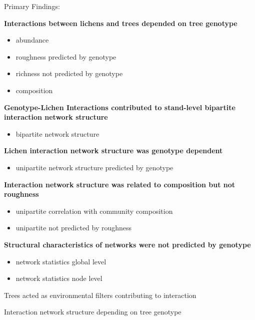 \documentclass[fleqn,10pt]{wlscirep}
\begin{document}
Primary Findings: 

\textbf{Interactions between lichens and trees depended on tree genotype}
\begin{itemize}
\item abundance
\item roughness predicted by genotype
\item richness not predicted by genotype
\item composition
\end{itemize}

\textbf{Genotype-Lichen Interactions contributed to stand-level
  bipartite interaction network structure}
\begin{itemize}
\item bipartite network structure
\end{itemize}

\textbf{Lichen interaction network structure was genotype dependent}
\begin{itemize}
\item unipartite network structure predicted by genotype
\end{itemize}

\textbf{Interaction network structure was related to composition but
  not roughness}
\begin{itemize}
\item unipartite correlation with community composition
\item unipartite not predicted by roughness
\end{itemize}

\textbf{Structural characteristics of networks were not predicted by genotype}
\begin{itemize}
\item network statistics global level
\item network statistics node level
\end{itemize}

Trees acted as environmental filters contributing to interaction

Interaction network structure depending on tree genotype
\end{document}
